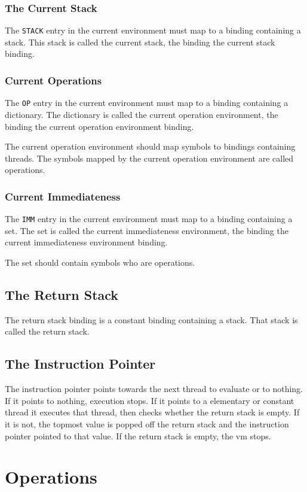 \documentclass[a4paper]{article}
\begin{document}
\subsubsection{The Current Stack}
The \texttt{STACK} entry in the current environment must map to a binding
containing a stack. This stack is called the current stack, the binding the
current stack binding.
\subsubsection{Current Operations}
The \texttt{OP} entry in the current environment must map to a binding
containing a dictionary. The dictionary is called the current operation
environment, the binding the current operation environment binding.

The current operation environment should map symbols to bindings containing
threads. The symbols mapped by the current operation environment are called
operations.
\subsubsection{Current Immediateness}
The \texttt{IMM} entry in the current environment must map to a binding
containing a set. The set is called the current immediateness environment, the
binding the current immediateness environment binding.

The set should contain symbols who are operations.

\subsection{The Return Stack}
The return stack binding is a constant binding containing a stack. That stack is
called the return stack.

\subsection{The Instruction Pointer}
The instruction pointer points towards the next thread to evaluate or to
nothing. If it points to nothing, execution stops. If it points to a elementary
or constant thread it executes that thread, then checks whether the return stack
is empty. If it is not, the topmost value is popped off the return stack and the
instruction pointer pointed to that value. If the return stack is empty, the vm
stops.


\section{Operations}
\end{document}
